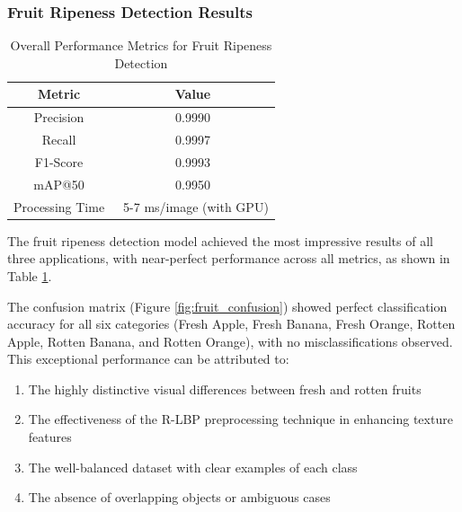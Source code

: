 \subsubsection{Fruit Ripeness Detection Results}

\begin{table}[ht]
\centering
\begin{tabular}{|c|c|}
\hline
\textbf{Metric} & \textbf{Value} \\
\hline
Precision & 0.9990 \\
Recall & 0.9997 \\
F1-Score & 0.9993 \\
mAP@50 & 0.9950 \\
Processing Time & ~5-7 ms/image (with GPU) \\
\hline
\end{tabular}
\caption{Overall Performance Metrics for Fruit Ripeness Detection}
\label{tab:fruit_results}
\end{table}

\begin{multicols}{2}
The fruit ripeness detection model achieved the most impressive results of all three applications, with near-perfect performance across all metrics, as shown in Table \ref{tab:fruit_results}.

The confusion matrix (Figure \ref{fig:fruit_confusion}) showed perfect classification accuracy for all six categories (Fresh Apple, Fresh Banana, Fresh Orange, Rotten Apple, Rotten Banana, and Rotten Orange), with no misclassifications observed. This exceptional performance can be attributed to:
\begin{enumerate}
    \item The highly distinctive visual differences between fresh and rotten fruits
    \item The effectiveness of the R-LBP preprocessing technique in enhancing texture features
    \item The well-balanced dataset with clear examples of each class
    \item The absence of overlapping objects or ambiguous cases
\end{enumerate}
\end{multicols}

